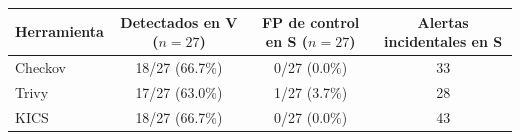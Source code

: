 \begin{tabular}{lccc}
\toprule
Herramienta & Detectados en V ($n=27$) & FP de control en S ($n=27$) & Alertas incidentales en S \\
\midrule
Checkov & 18/27 (66.7\%) & 0/27 (0.0\%) & 33 \\
Trivy & 17/27 (63.0\%) & 1/27 (3.7\%) & 28 \\
KICS & 18/27 (66.7\%) & 0/27 (0.0\%) & 43 \\
\bottomrule
\end{tabular}
